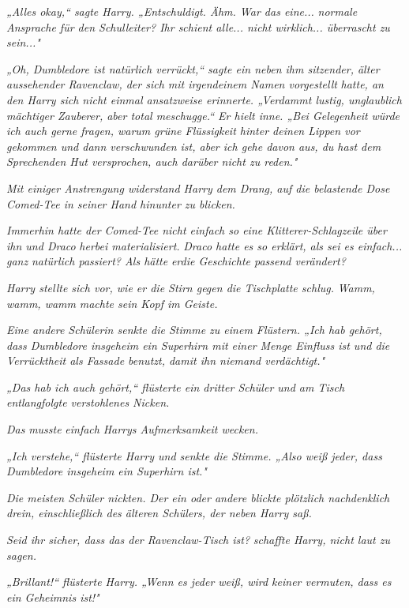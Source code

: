 {\emph{„Alles okay,“ sagte Harry. „Entschuldigt. Ähm. War das eine...} \emph{\emph{normale}} \emph{Ansprache für den Schulleiter? Ihr schient alle... nicht wirklich... überrascht zu sein..."}

\emph{„Oh, Dumbledore ist natürlich verrückt,“ sagte ein neben ihm sitzender, älter aussehender Ravenclaw, der sich mit irgendeinem Namen vorgestellt} \emph{hatte, an den Harry sich nicht einmal ansatzweise erinnerte. „Verdammt lustig, unglaublich mächtiger Zauberer, aber total meschugge.“ Er hielt inne. „Bei Gelegenheit} \emph{würde ich auch gerne fragen, warum grüne Flüssigkeit hinter deinen Lippen vor gekommen und dann verschwunden ist, aber ich gehe davon aus, du hast dem Sprechenden Hut versprochen, auch darüber nicht zu reden."}

\emph{Mit einiger Anstrengung widerstand Harry dem Drang, auf die belastende Dose Comed-Tee in seiner Hand hinunter zu blicken.}

\emph{Immerhin hatte der Comed-Tee nicht einfach so eine Klitterer-Schlagzeile über ihn und Draco} \emph{\emph{herbei materialisiert.}} \emph{Draco hatte es so erklärt, als sei es einfach...} \emph{ganz} \emph{natürlich passiert? Als hätte} \emph{er\emph{die Geschichte passend verändert?}}

\emph{Harry stellte sich vor, wie er die Stirn gegen die Tischplatte schlug.} \emph{\emph{Wamm, wamm, wamm}} \emph{machte sein Kopf im Geiste.}

\emph{Eine andere Schülerin senkte die Stimme zu einem Flüstern. „Ich hab gehört, dass Dumbledore insgeheim ein Superhirn mit einer Menge Einfluss ist und die Verrücktheit als Fassade benutzt, damit ihn niemand verdächtigt."}

\emph{„Das hab ich auch gehört,“ flüsterte ein dritter Schüler und am Tisch} \emph{entlangfolgte verstohlenes Nicken.}

\emph{Das} \emph{musste} \emph{einfach} \emph{Harrys Aufmerksamkeit wecken.}

\emph{„Ich verstehe,“ flüsterte Harry und senkte die Stimme. „Also weiß jeder, dass Dumbledore insgeheim ein Superhirn ist."}

\emph{Die meisten Schüler nickten. Der ein oder andere blickte plötzlich nachdenklich drein, einschließlich des älteren Schülers, der neben Harry saß.}

\emph{\emph{Seid ihr sicher, dass das der Ravenclaw-Tisch ist?}} \emph{schaffte Harry, nicht laut zu sagen.}

\emph{„Brillant!“ flüsterte Harry. „Wenn es jeder weiß, wird keiner vermuten, dass es ein Geheimnis ist!"}

}

